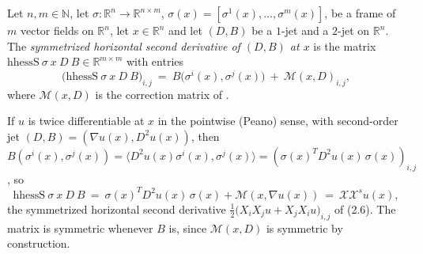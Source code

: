\begin{definition}
Let $n,m\in\mathbb N$, let
$\sigma:\mathbb R^n\to\mathbb R^{n\times m}$, $\sigma(x)=[\sigma^1(x),\ldots,\sigma^m(x)]$,
be a frame of $m$ vector fields on $\mathbb R^n$, let $x\in\mathbb R^n$ and let $(D,B)$ be
a $1$-jet and a $2$-jet on $\mathbb R^n$. The \emph{symmetrized horizontal second
derivative of $(D,B)$ at $x$} is the matrix
$\mathrm{hhessS}\ \sigma\ x\ D\ B\in\mathbb R^{m\times m}$ with entries
\[
 \big(\mathrm{hhessS}\ \sigma\ x\ D\ B\big)_{i,j}
 \ =\ B\big(\sigma^{i}(x),\sigma^{j}(x)\big)\ +\ \mathcal M(x,D)_{i,j},
\]
where $\mathcal M(x,D)$ is the correction matrix of .

If $u$ is twice differentiable at $x$ in the pointwise (Peano) sense, with second-order
jet $(D,B)=(\nabla u(x),D^2u(x))$, then $B(\sigma^i(x),\sigma^j(x))=\langle
D^2u(x)\sigma^i(x),\sigma^j(x)\rangle=(\sigma(x)^TD^2u(x)\,\sigma(x))_{i,j}$, so
\[
 \mathrm{hhessS}\ \sigma\ x\ D\ B
 \ =\ \sigma(x)^TD^2u(x)\,\sigma(x)+\mathcal M(x,\nabla u(x))
 \ =\ \mathcal X\mathcal X^{s}u(x),
\]
the symmetrized horizontal second derivative
$\tfrac12\big(X_iX_ju+X_jX_iu\big)_{i,j}$ of (2.6). The matrix is symmetric whenever
$B$ is, since $\mathcal M(x,D)$ is symmetric by construction.
\end{definition}
